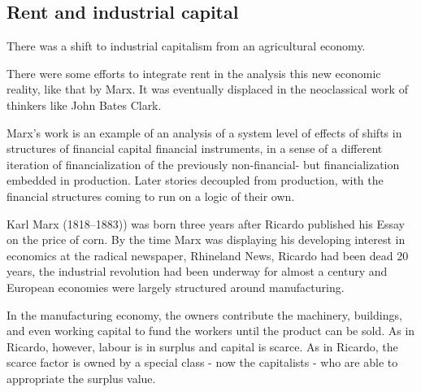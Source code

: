 \subsection{Rent and industrial capital}

There was a shift to industrial capitalism from an agricultural economy.

There were some efforts to integrate rent in the analysis  this new economic reality, like that by Marx.
It was eventually displaced in the neoclassical work of thinkers like John Bates Clark.

Marx's work is an example of an analysis of a system level of effects of shifts in structures of financial capital financial instruments, in a sense of a different iteration of financialization of the previously non-financial- but financialization embedded in production. Later stories decoupled from production, with the financial structures coming to run on a logic of their own.

Karl Marx (1818--1883)) was born three years after Ricardo published his Essay on the price of corn. 
By the time Marx was displaying  his developing interest in economics  at the radical newspaper, Rhineland News, Ricardo had been dead 20 years, the industrial revolution had been underway for almost a century and European economies were largely structured around manufacturing. 

 In the manufacturing economy, the owners contribute the machinery, buildings, and even working capital to fund the workers until the product can be sold. %
As in Ricardo, however, labour is in surplus and capital is scarce. As in Ricardo, the scarce factor is owned by a special class - now the capitalists - who are able to appropriate the surplus value. %

